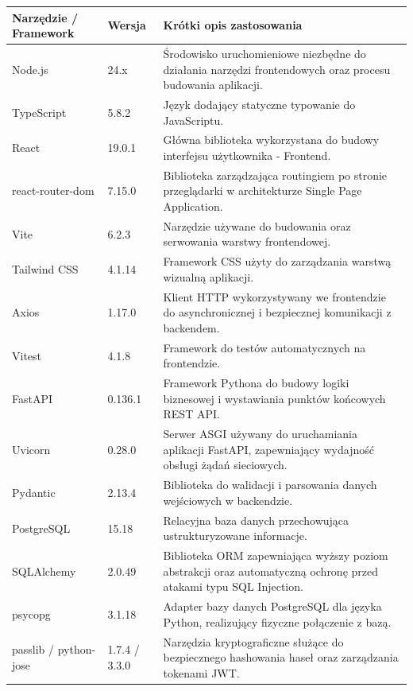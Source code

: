 \documentclass[12pt,twoside]{article}
\begin{document}
\begin{table}[htbp]
    \centering
    \begin{tabular}{|l|l|p{7cm}|}
    \hline
    \textbf{Narzędzie / Framework} & \textbf{Wersja} & \textbf{Krótki opis zastosowania} \\ \hline
    Node.js & 24.x & Środowisko uruchomieniowe niezbędne do działania narzędzi frontendowych oraz procesu budowania aplikacji. \\ \hline
    TypeScript & 5.8.2 & Język dodający statyczne typowanie do JavaScriptu. \\ \hline
    React & 19.0.1 & Główna biblioteka wykorzystana do budowy interfejsu użytkownika - Frontend. \\ \hline
    react-router-dom & 7.15.0 & Biblioteka zarządzająca routingiem po stronie przeglądarki w architekturze Single Page Application. \\ \hline
    Vite & 6.2.3 & Narzędzie używane do budowania oraz serwowania warstwy frontendowej. \\ \hline
    Tailwind CSS & 4.1.14 & Framework CSS użyty do zarządzania warstwą wizualną aplikacji. \\ \hline
    Axios & 1.17.0 & Klient HTTP wykorzystywany we frontendzie do asynchronicznej i bezpiecznej komunikacji z backendem. \\ \hline
    Vitest & 4.1.8 & Framework do testów automatycznych na frontendzie. \\ \hline
    FastAPI & 0.136.1 & Framework Pythona do budowy logiki biznesowej i wystawiania punktów końcowych REST API. \\ \hline
    Uvicorn & 0.28.0 & Serwer ASGI używany do uruchamiania aplikacji FastAPI, zapewniający wydajność obsługi żądań sieciowych. \\ \hline
    Pydantic & 2.13.4 & Biblioteka do walidacji i parsowania danych wejściowych w backendzie. \\ \hline
    PostgreSQL & 15.18 & Relacyjna baza danych przechowująca ustrukturyzowane informacje. \\ \hline
    SQLAlchemy & 2.0.49 & Biblioteka ORM zapewniająca wyższy poziom abstrakcji oraz automatyczną ochronę przed atakami typu SQL Injection. \\ \hline
    psycopg & 3.1.18 & Adapter bazy danych PostgreSQL dla języka Python, realizujący fizyczne połączenie z bazą. \\ \hline
    passlib / python-jose & 1.7.4 / 3.3.0 & Narzędzia kryptograficzne służące do bezpiecznego hashowania haseł oraz zarządzania tokenami JWT. \\ \hline

\end{tabular}
\end{table}
\end{document}
